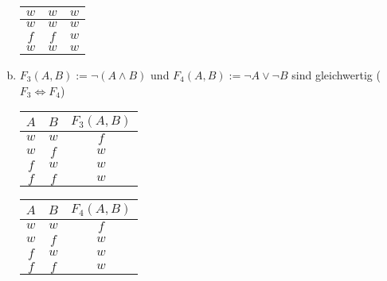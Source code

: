 \begin{enumerate}[a)]
\begin{table*}[h]
\begin{minipage}{1\linewidth}
\begin{tabular}{|c|c|c|}
                \hline
                $w$ & $w$ & $w$ \\
                \hline
                $w$ & $w$ & $w$ \\
                \hline
                $f$ & $f$ & $w$ \\
                \hline
                $w$ & $w$ & $w$ \\
                \hline
            \end{tabular}
        \end{minipage}
    \end{table*}
    \item $F_3(A, B) := \lnot (A \land B)$ und $F_4(A, B) := \lnot A \lor \lnot
        B$ sind gleichwertig ($F_3 \Leftrightarrow F_4$)
    \begin{table*}[h]
        \centering
        \begin{minipage}{.29\linewidth}
            \centering
            \begin{tabular}{|c|c|c|}
                \hline
                $A$ & $B$ & $F_3(A, B)$ \\
                \hline
                $w$ & $w$ & $f$ \\
                \hline
                $w$ & $f$ & $w$ \\
                \hline
                $f$ & $w$ & $w$ \\
                \hline
                $f$ & $f$ & $w$ \\
                \hline
            \end{tabular}
        \end{minipage}%
        \begin{minipage}{.29\linewidth}
            \centering
            \begin{tabular}{|c|c|c|}
                \hline
                $A$ & $B$ & $F_4(A, B)$ \\
                \hline
                $w$ & $w$ & $f$ \\
                \hline
                $w$ & $f$ & $w$ \\
                \hline
                $f$ & $w$ & $w$ \\
                \hline
                $f$ & $f$ & $w$ \\
                \hline
            \end{tabular}
        \end{minipage}  \\[15pt]
        \begin{minipage}{1\linewidth}

\end{minipage}
\end{table*}
\end{enumerate}
